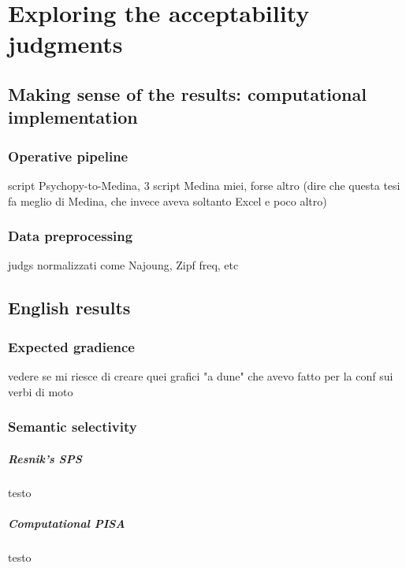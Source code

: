 \setchapterpreamble[u]{\margintoc}
\chapter{Exploring the acceptability judgments}


\section{Making sense of the results: computational implementation} 

\subsection{Operative pipeline} 

script Psychopy-to-Medina, 3 script Medina miei, forse altro (dire che questa tesi fa meglio di Medina, che invece aveva soltanto Excel e poco altro)

\subsection{Data preprocessing} 

judgs normalizzati come Najoung, Zipf freq, etc


\section{English results} 

\subsection{Expected gradience} 

vedere se mi riesce di creare quei grafici "a dune" che avevo fatto per la conf sui verbi di moto

\subsection{Semantic selectivity} 

\paragraph{Resnik's SPS} testo

\paragraph{Computational PISA} testo

